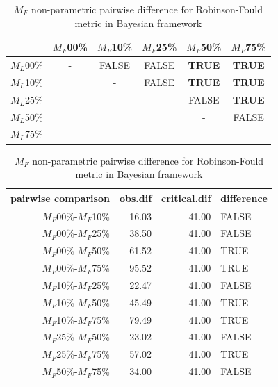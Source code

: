 \documentclass[12pt,letterpaper]{article}
\begin{document}
\begin{table}
\caption{$M_F$ non-parametric pairwise difference for Robinson-Fould metric in Bayesian framework}
\centering
\begin{tabular}{c|ccccc}
    \hline
              & $M_F$00\% & $M_F$10\% & $M_F$25\% & $M_F$50\% & $M_F$75\% \\
    \hline
    $M_L$00\% & - & FALSE & FALSE & \textbf{TRUE} & \textbf{TRUE}\\
    $M_L$10\% & & - & FALSE & \textbf{TRUE} & \textbf{TRUE} \\
    $M_L$25\% & & & - & FALSE & \textbf{TRUE} \\
    $M_L$50\% & & & & - & FALSE \\
    $M_L$75\% & & & & & - \\
    \hline
\end{tabular}
\centering
\begin{tabular}{rrrl}
 pairwise comparison & obs.dif & critical.dif & difference \\ 
  \hline
  $M_F$00\%-$M_F$10\% & 16.03 & 41.00 & FALSE \\ 
  $M_F$00\%-$M_F$25\% & 38.50 & 41.00 & FALSE \\ 
  $M_F$00\%-$M_F$50\% & 61.52 & 41.00 & TRUE \\ 
  $M_F$00\%-$M_F$75\% & 95.52 & 41.00 & TRUE \\ 
  $M_F$10\%-$M_F$25\% & 22.47 & 41.00 & FALSE \\ 
  $M_F$10\%-$M_F$50\% & 45.49 & 41.00 & TRUE \\ 
  $M_F$10\%-$M_F$75\% & 79.49 & 41.00 & TRUE \\ 
  $M_F$25\%-$M_F$50\% & 23.02 & 41.00 & FALSE \\ 
  $M_F$25\%-$M_F$75\% & 57.02 & 41.00 & TRUE \\ 
  $M_F$50\%-$M_F$75\% & 34.00 & 41.00 & FALSE \\ 
   \hline
\end{tabular}
\label{Ba_RF-MF_results}
\end{table}
\end{document}
